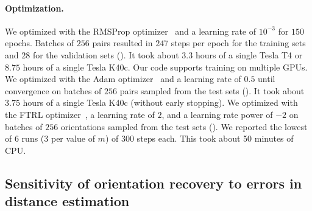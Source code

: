 \paragraph{Optimization.}
We optimized  with the RMSProp optimizer~\cite{tieleman2012rmsprop} and a learning rate of $10^{-3}$ for $150$ epochs.
Batches of $256$ pairs resulted in $247$ steps per epoch for the training sets and $28$ for the validation sets ().
It took about $3.3$ hours of a single Tesla T4 or $8.75$ hours of a single Tesla K40c.
Our code supports training on multiple GPUs.
We optimized  with the Adam optimizer~\cite{kingma2014adam} and a learning rate of $0.5$ until convergence on batches of $256$ pairs sampled from the test sets ().
It took about $3.75$ hours of a single Tesla K40c (without early stopping).
We optimized  with the FTRL optimizer~\cite{mcmahan2013ftrl}, a learning rate of $2$, and a learning rate power of $-2$ on batches of $256$ orientations sampled from the test sets ().
We reported the lowest of 6 runs (3 per value of $m$) of 300 steps each.
This took about 50 minutes of CPU\@.


\subsection{Sensitivity of orientation recovery to errors in distance estimation}\label{sec:results:orientation-recovery:sensitivity}


